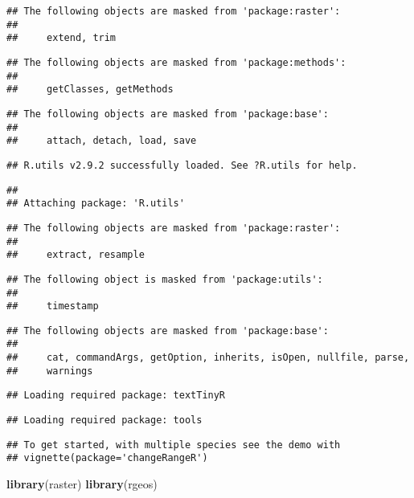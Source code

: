 \documentclass[
]{article}
\newenvironment{Shaded}{\begin{snugshade}}{\end{snugshade}}
\newcommand{\KeywordTok}[1]{\textcolor[rgb]{0.13,0.29,0.53}{\textbf{#1}}}
\newcommand{\NormalTok}[1]{#1}
\begin{document}
\begin{verbatim}
## The following objects are masked from 'package:raster':
## 
##     extend, trim
\end{verbatim}

\begin{verbatim}
## The following objects are masked from 'package:methods':
## 
##     getClasses, getMethods
\end{verbatim}

\begin{verbatim}
## The following objects are masked from 'package:base':
## 
##     attach, detach, load, save
\end{verbatim}

\begin{verbatim}
## R.utils v2.9.2 successfully loaded. See ?R.utils for help.
\end{verbatim}

\begin{verbatim}
## 
## Attaching package: 'R.utils'
\end{verbatim}

\begin{verbatim}
## The following objects are masked from 'package:raster':
## 
##     extract, resample
\end{verbatim}

\begin{verbatim}
## The following object is masked from 'package:utils':
## 
##     timestamp
\end{verbatim}

\begin{verbatim}
## The following objects are masked from 'package:base':
## 
##     cat, commandArgs, getOption, inherits, isOpen, nullfile, parse,
##     warnings
\end{verbatim}

\begin{verbatim}
## Loading required package: textTinyR
\end{verbatim}

\begin{verbatim}
## Loading required package: tools
\end{verbatim}

\begin{verbatim}
## To get started, with multiple species see the demo with 
## vignette(package='changeRangeR')
\end{verbatim}

\begin{Shaded}
\begin{Highlighting}[]
\KeywordTok{library}\NormalTok{(raster)}
\KeywordTok{library}\NormalTok{(rgeos)}
\end{Highlighting}
\end{Shaded}
\end{document}
